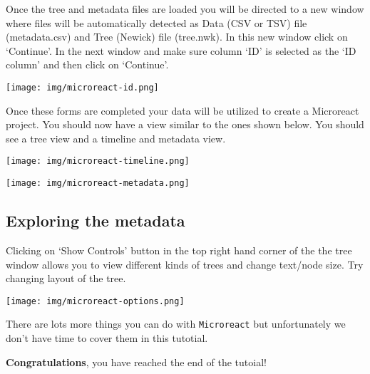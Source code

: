 \documentclass[11pt]{article}
\begin{document}
Once the tree and metadata files are loaded you will be directed to a
new window where files will be automatically detected as Data (CSV or
TSV) file (metadata.csv) and Tree (Newick) file (tree.nwk). In this new
window click on `Continue'. In the next window and make sure column `ID'
is selected as the `ID column' and then click on `Continue'.


\begin{center}
\texttt{[image: img/microreact-id.png]}
\end{center}


Once these forms are completed your data will be utilized to create a
Microreact project. You should now have a view similar to the ones shown
below. You should see a tree view and a timeline and metadata view.


\begin{center}
\texttt{[image: img/microreact-timeline.png]}
\end{center}



\begin{center}
\texttt{[image: img/microreact-metadata.png]}
\end{center}


    \hypertarget{exploring-the-metadata}{%
\subsection{Exploring the metadata}\label{exploring-the-metadata}}

Clicking on `Show Controls' button in the top right hand corner of the
the tree window allows you to view different kinds of trees and change
text/node size. Try changing layout of the tree.


\begin{center}
\texttt{[image: img/microreact-options.png]}
\end{center}


There are lots more things you can do with \texttt{Microreact} but
unfortunately we don't have time to cover them in this tutotial.

\textbf{Congratulations}, you have reached the end of the tutoial!


\end{document}
